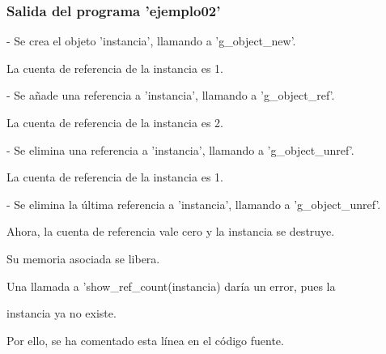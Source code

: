 \subsubsection{Salida del programa 'ejemplo02'}
\textsf{- Se crea el objeto 'instancia', llamando a 'g\_object\_new'.}\par
\textsf{  La cuenta de referencia de la instancia es 1.}
\par\textsf{ }\par
\textsf{- Se añade una referencia a 'instancia', llamando a 'g\_object\_ref'.}\par
\textsf{  La cuenta de referencia de la instancia es 2.}\par
\par\textsf{ }\par
\textsf{- Se elimina una referencia a 'instancia', llamando a 'g\_object\_unref'.}\par
\textsf{  La cuenta de referencia de la instancia es 1.}\par
\par\textsf{ }\par
\textsf{- Se elimina la última referencia a 'instancia', llamando a 'g\_object\_unref'.}\par
\textsf{  Ahora, la cuenta de referencia vale cero y la instancia se destruye.}\par
\textsf{  Su memoria asociada se libera.}\par
\textsf{  Una llamada a 'show\_ref\_count(instancia) daría un error, pues la}\par
\textsf{  instancia ya no existe.}\par
\textsf{  Por ello, se ha comentado esta línea en el código fuente.}\par

